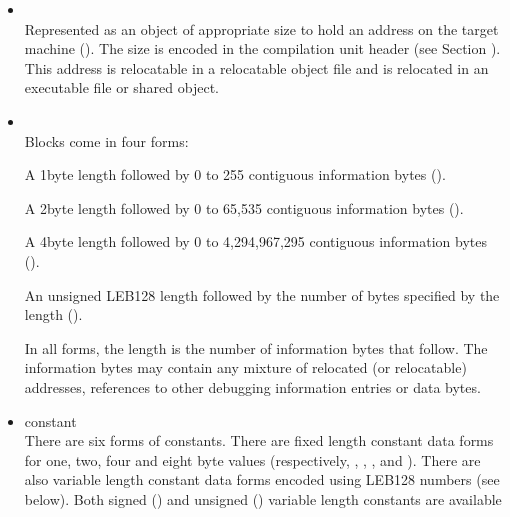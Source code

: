 \begin{itemize}
\item {} \\
Represented as an object of appropriate size to hold an
address on the target machine 
(). 
The size is
encoded in the compilation unit header 
(see Section ).
This address is relocatable in a relocatable object file and
is relocated in an executable file or shared object.

\item {} \\
Blocks come in four forms:

\begin{myindentpara}{1cm}
A 1\dash byte length followed by 0 to 255 contiguous information
bytes ().
\end{myindentpara}

\begin{myindentpara}{1cm}
A 2\dash byte length followed by 0 to 65,535 contiguous information
bytes ().
\end{myindentpara}


\begin{myindentpara}{1cm}
A 4\dash byte length followed by 0 to 4,294,967,295 contiguous
information bytes ().
\end{myindentpara}


\begin{myindentpara}{1cm}
An unsigned LEB128 length followed by the number of bytes
specified by the length ().
\end{myindentpara}

In all forms, the length is the number of information bytes
that follow. The information bytes may contain any mixture
of relocated (or relocatable) addresses, references to other
debugging information entries or data bytes.

\item constant \\
There are six forms of constants. There are fixed length
constant data forms for one, two, four and eight byte values
(respectively, 
, 
, 
,
and ). 
There are also variable length constant
data forms encoded using LEB128 numbers (see below). Both
signed () and unsigned 
() variable
length constants are available


\end{itemize}
